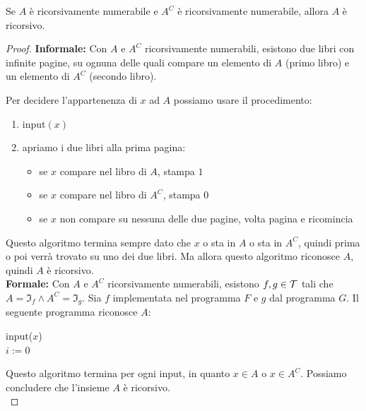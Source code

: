 \begin{theor}
	Se $A$ è ricorsivamente numerabile e $A^C$ è ricorsivamente numerabile, allora $A$ è ricorsivo.
\end{theor}
\begin{proof}
	\textbf{Informale:} Con $A$ e $A^C$ ricorsivamente numerabili, esistono due libri con infinite pagine, su ognuna delle quali compare un elemento di $A$ (primo libro) e un elemento di $A^C$ (secondo libro).
	
	Per decidere l'appartenenza di $x$ ad $A$ possiamo usare il procedimento: 
	\begin{enumerate}
		\item input$(x)$
		\item apriamo i due libri alla prima pagina:
		\begin{itemize}
			\item se $x$ compare nel libro di $A$, stampa $1$
			\item se $x$ compare nel libro di $A^C$, stampa $0$
			\item se $x$ non compare su nessuna delle due pagine, volta pagina e ricomincia
		\end{itemize}
	\end{enumerate}
	
	Questo algoritmo termina sempre dato che $x$ o sta in $A$ o sta in $A^C$, quindi prima o poi verrà trovato su uno dei due libri. Ma allora questo algoritmo riconosce $A$, quindi $A$ è ricorsivo.\\
	
	\textbf{Formale:} Con $A$ e $A^C$ ricorsivamente numerabili, esistono $f,g \in \mathcal{T}$ tali che $A = \Im_f \wedge A^C = \Im_g$. Sia $f$ implementata nel programma $F$ e $g$ dal programma $G$. Il seguente programma riconosce $A$:
	\begin{center}
		\begin{minipage}{.5\textwidth}
			\begin{tcolorbox}[
				colback=white,
				sharp corners,
				boxrule=.3mm,
				left=20pt,
				top=0pt,
				bottom=0pt,
				colbacktitle=white,
				coltitle=black
				]
				\begin{algorithm}[H]
					input($x$) \\
					$i:=0$ \\
				\end{algorithm}
			\end{tcolorbox}
		\end{minipage}
	\end{center}
	
	Questo algoritmo termina per ogni input, in quanto $x \in A$ o $x \in A^C$. Possiamo concludere che l'insieme $A$ è ricorsivo.\\
\end{proof}

